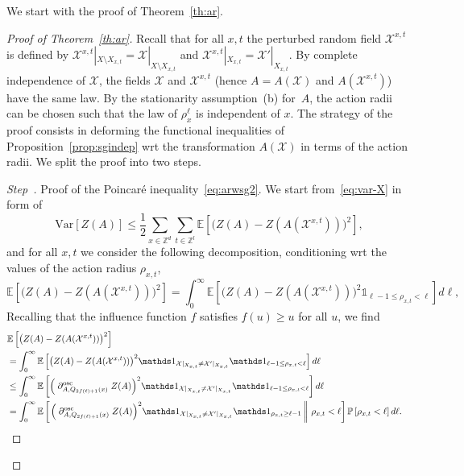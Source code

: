 \documentclass[10pt]{amsart}
\theoremstyle{definition}\newtheorem{defi}[theo]{Definition}\newtheorem{rema}[theo]{Remark}\newtheorem{exam}[theo]{Example}\newtheorem{exem}[theo]{Example}\newtheorem{nota}[theo]{Notation}
\newcommand{\Z}{\mathbb Z}
\newcommand{\expec}[1]{\mathbb{E}\left[#1 \right]}
\newcommand{\pr}[1]{\mathbb{P}\left[#1 \right]}
\newcommand{\expeC}[2]{\mathbb{E}\left[\left. #1 \,\right\|\,#2\right]}
\newcommand{\X}{\mathcal X}
\newcommand{\osc}{\partial^{\mathrm{osc}}}
\newcommand{\oscd}[1]{\mathrel{\osc_{#1}}}
\newcommand{\var}[1]{\mathrm{Var}\left[#1\right]}
\newcounter{stepcount}
\newenvironment{step}{\refstepcounter{stepcount}\begin{proof}[Step~\thestepcount]}{\let\qed\relax\end{proof}}
\begin{document}
We start with the proof of Theorem~\ref{th:ar}.
\begin{proof}[Proof of Theorem~\ref{th:ar}]
Recall that for all $x,t$ the perturbed random field $\X^{x,t}$ is defined by $\X^{x,t}|_{X\setminus X_{x,t}}=\X|_{X\setminus X_{x,t}}$ and $\X^{x,t}|_{X_{x,t}}=\X'|_{X_{x,t}}$. By complete independence of $\X$, the fields $\X$ and $\X^{x,t}$ (hence $A=A(\X)$ and $A(\X^{x,t})$) have the same law. By the stationarity assumption~(b) for~$A$, the action radii can be chosen such that the law of $\rho_x^\ell$ is independent of $x$. The strategy of the proof consists in deforming the functional inequalities of Proposition~\ref{prop:sgindep} wrt the transformation $A(\X)$ in terms of the action radii. We split the proof into two steps.



\begin{step}{Proof of the Poincaré inequality~\eqref{eq:arwsg2}.}\label{step1prooftheo2.6}
We start from~\eqref{eq:var-X} in form of
\begin{equation}\label{eq:var-X-re0}
\var{Z(A)}\le\frac12\sum_{x\in\Z^d}\sum_{t\in\Z^l}\expec{\big(Z(A)-Z(A(\X^{x,t}))\big)^2},
\end{equation}
and for all $x,t$ we consider the following decomposition, conditioning wrt the values of the action radius $\rho_{x,t}$,
\begin{equation*}
\expec{\big(Z(A)-Z(A(\X^{x,t}))\big)^2}=\int_0^\infty \expec{\big(Z(A)-Z(A(\X^{x,t}))\big)^2\mathds1_{\ell-1\le \rho_{x,t}< \ell}}d\ell,
\end{equation*}
Recalling that the influence function $f$ satisfies $f(u)\ge u$ for all $u$, we find
\begin{align*}
\lefteqn{\expec{\big(Z(A)-Z(A(\X^{x,t}))\big)^2}}\\
&=\int_0^\infty \expec{\big(Z(A)-Z(A(\X^{x,t}))\big)^2\mathds1_{\X|_{X_{x,t}}\ne \X'|_{X_{x,t}}}\mathds1_{\ell-1\le \rho_{x,t}< \ell}}d\ell\\
&\le\int_0^\infty \expec{\Big(\oscd{A,Q_{2f(\ell)+1}(x)}Z(A)\Big)^2\mathds1_{\X|_{X_{x,t}}\ne \X'|_{X_{x,t}}}\mathds1_{\ell-1\le \rho_{x,t}< \ell}}d\ell\\
&=\int_0^\infty \expeC{\Big(\oscd{A,Q_{2f(\ell)+1}(x)}Z(A)\Big)^2\mathds1_{\X|_{X_{x,t}}\ne \X'|_{X_{x,t}}}\mathds1_{\rho_{x,t}\ge\ell-1}}{\rho_{x,t}<\ell}\pr{\rho_{x,t}< \ell}d\ell.
\end{align*}
\pagebreak


\end{step}
\end{proof}
\end{document}

